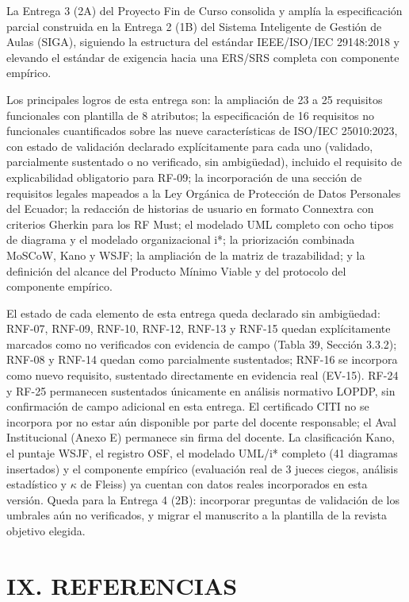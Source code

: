 La Entrega 3 (2A) del Proyecto Fin de Curso consolida y amplía la especificación parcial construida en la Entrega 2 (1B) del Sistema Inteligente de Gestión de Aulas (SIGA), siguiendo la estructura del estándar IEEE/ISO/IEC 29148:2018 y elevando el estándar de exigencia hacia una ERS/SRS completa con componente empírico.


Los principales logros de esta entrega son: la ampliación de 23 a 25 requisitos funcionales con plantilla de 8 atributos; la especificación de 16 requisitos no funcionales cuantificados sobre las nueve características de ISO/IEC 25010:2023, con estado de validación declarado explícitamente para cada uno (validado, parcialmente sustentado o no verificado, sin ambigüedad), incluido el requisito de explicabilidad obligatorio para RF-09; la incorporación de una sección de requisitos legales mapeados a la Ley Orgánica de Protección de Datos Personales del Ecuador; la redacción de historias de usuario en formato Connextra con criterios Gherkin para los RF Must; el modelado UML completo con ocho tipos de diagrama y el modelado organizacional i*; la priorización combinada MoSCoW, Kano y WSJF; la ampliación de la matriz de trazabilidad; y la definición del alcance del Producto Mínimo Viable y del protocolo del componente empírico.


El estado de cada elemento de esta entrega queda declarado sin ambigüedad: RNF-07, RNF-09, RNF-10, RNF-12, RNF-13 y RNF-15 quedan explícitamente marcados como no verificados con evidencia de campo (Tabla 39, Sección 3.3.2); RNF-08 y RNF-14 quedan como parcialmente sustentados; RNF-16 se incorpora como nuevo requisito, sustentado directamente en evidencia real (EV-15). RF-24 y RF-25 permanecen sustentados únicamente en análisis normativo LOPDP, sin confirmación de campo adicional en esta entrega. El certificado CITI no se incorpora por no estar aún disponible por parte del docente responsable; el Aval Institucional (Anexo E) permanece sin firma del docente. La clasificación Kano, el puntaje WSJF, el registro OSF, el modelado UML/i* completo (41 diagramas insertados) y el componente empírico (evaluación real de 3 jueces ciegos, análisis estadístico y $\kappa$ de Fleiss) ya cuentan con datos reales incorporados en esta versión. Queda para la Entrega 4 (2B): incorporar preguntas de validación de los umbrales aún no verificados, y migrar el manuscrito a la plantilla de la revista objetivo elegida.


\section*{IX. REFERENCIAS}


